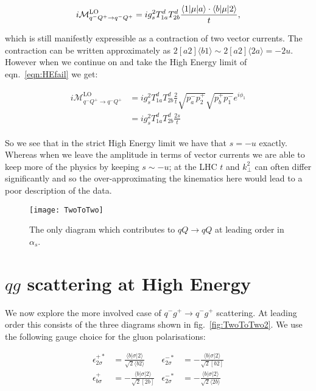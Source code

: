 	\begin{equation}
		i\mathcal{M}_{q^-Q^+\rightarrow q^-Q^+}^{\text{LO}} = ig_s^2T^d_{1a}T^d_{2b}
		\frac{\langle 1 | \mu | a \rangle\cdot\langle b | \mu | 2 \rangle}{t},
		\label{eqn:HEfail}
	\end{equation}

	which is still manifestly expressible as a contraction of two vector currents.  The contraction
	can be written approximately as $2[a2]\langle b1\rangle\sim2[a2]\langle2a\rangle=-2u$.
	However when we continue on and take the High Energy limit of eqn.~\eqref{eqn:HEfail} we get:

	\begin{align}
	\begin{split}
		i\mathcal{M}_{q^-Q^+\rightarrow q^-Q^+}^{\text{LO}} &=
		ig_s^2T^d_{1a}T^d_{2b}\frac{2}{t}\sqrt{p_a^-p_2^+}\sqrt{p_b^+p_1^-}e^{i\phi_1}\\
		&=ig_s^2T^d_{1a}T^d_{2b}\frac{2s}{t}
		\label{eqn:HEfail2}
	\end{split}
	\end{align}

	So we see that in the strict High Energy limit we have that $s=-u$
	exactly.  Whereas when we leave the amplitude in terms of vector currents we are able to keep
	more of the physics by keeping $s\sim-u$; at the LHC $t$ and $k_\perp^2$
	can often differ significantly and so the over-approximating the kinematics here would
	lead to a poor description of the data.

	\begin{figure}
		\begin{center}
		\texttt{[image: TwoToTwo]}
		\caption{The only diagram which contributes to $qQ\rightarrow qQ$ at leading order in $\alpha_s$.}
		\label{fig:TwoToTwo}
		\end{center}
	\end{figure}

\section{$qg$ scattering at High Energy}
	\label{sec:qg}

	We now explore the more involved case of $q^-g^+\to q^-g^+$ scattering.  At leading order this
	consists of the three diagrams shown in fig.~\eqref{fig:TwoToTwo2}.  We use the following gauge
	choice for the gluon polarisations:

	\begin{align}
	\epsilon^{+*}_{2\sigma}&=\frac{\langle b|\sigma|2\rangle}{\sqrt{2}\langle b2\rangle}
	& \epsilon^{-*}_{2\sigma} &= -\frac{\langle b|\sigma|2\rangle}{\sqrt{2}[b2]} \\
	\epsilon^{+}_{b\sigma}&=-\frac{\langle b|\sigma|2\rangle}{\sqrt{2}[2b]}
	& \epsilon^{-*}_{2\sigma} &= -\frac{\langle b|\sigma|2\rangle}{\sqrt{2}\langle 2b\rangle}
	\end{align}

